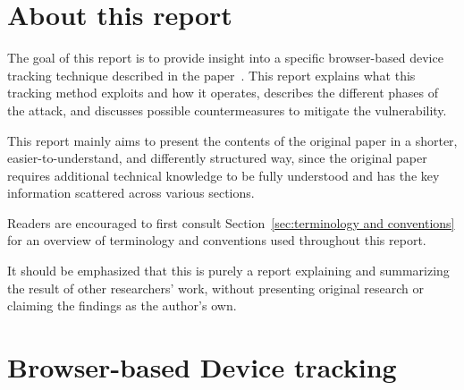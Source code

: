 \documentclass{report}
\begin{document}
\section{About this report}
\label{sec:goal_of_this_report}

The goal of this report is to provide insight into a specific browser-based device tracking technique described in the paper~\cite{kol2022devicetrackinglinuxsnew}. This report explains what this tracking method exploits and how it operates, describes the different phases of the attack, and discusses possible countermeasures to mitigate the vulnerability.

This report mainly aims to present the contents of the original paper in a shorter, easier-to-understand, and differently structured way, since the original paper requires additional technical knowledge to be fully understood and has the key information scattered across various sections.

Readers are encouraged to first consult Section~\ref{sec:terminology and conventions} for an overview of terminology and conventions used throughout this report.

\alert{It should be emphasized that this is purely a report explaining and summarizing the result of other researchers' work, without presenting original research or claiming the findings as the author's own.}

%


\section{Browser-based Device tracking}
\label{sec:Online browser-based device tracking}
\end{document}
